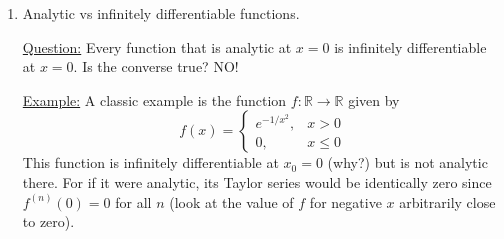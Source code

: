 \documentclass[11pt, letterpaper, oneside]{article}     %
\numberwithin{equation}{subsection}
\theoremstyle{definition}
\numberwithin{theorem}{section}
\theoremstyle{remark}
\newcommand{\RR}{\mathbb{R}}
\begin{document}
\begin{enumerate}
\begin{enumerate}
  \item \underline{Some notions.} Let
    \begin{equation}
      f(x) = \sum_{n=0}^\infty a_n(x-x_0)^n \quad\quad\text{with}\quad\quad R>0.
    \end{equation}
    \begin{enumerate}
    \item $f(x)$ is \emph{analytic} at $x = x_0$. (This is what it means to be analytic at $x_0$; there exists a convergent power series equal to the function on a neighborhood of $x_0$.)
    \item $a_n = f^{(n)}(x_0)/n!$, and $f(x) = a_0 + a_1(x - x_0) + a_2(x - x_0)^2 + \dots$, and in particular $f(x_0) = a_0$.
    \item Taylor series expansion: When $f$ is analytic at $x_0$, it has a particular power series representation for $f(x)$, given by
      \begin{equation}
        f(x) = \sum_{n=0}^\infty \frac{f^{(n)}(x_0)}{n!}(x-x_0)^n
      \end{equation}
      For example, the exponential function is its own derivative and $e^0 = 1$. This is enough to define the exponential everywhere by its Taylor series at $x_0 = 0$:
      \begin{equation}
        e^x = \sum_{n=0}^\infty \frac{(e^x)^{(n)}\big|_{x=0}}{n!}x^n = \sum_{n=0}^\infty \frac{e^0}{n!}x^n = \sum_{n=0}^\infty \frac{1}{n!}x^n,
      \end{equation}
      which should look familiar.

    \end{enumerate}

  \end{enumerate}

\item Analytic vs infinitely differentiable functions.

  \underline{Question:} Every function that is analytic at $x=0$ is infinitely differentiable at $x=0$. Is the converse true? NO!

  \underline{Example:}
  A classic example is the function $f:\RR \to \RR$ given by
  \begin{equation}
    f(x) =
    \begin{cases}
      e^{-1/x^2}, & x > 0\\
      0, & x \leq 0
    \end{cases}
  \end{equation}
  This function is infinitely differentiable at $x_0 = 0$ (why?) but is not analytic there. For if it were analytic, its Taylor series would be identically zero since $f^{(n)}(0) = 0$ for all $n$ (look at the value of $f$ for negative $x$ arbitrarily close to zero).


\end{enumerate}
\end{document}
